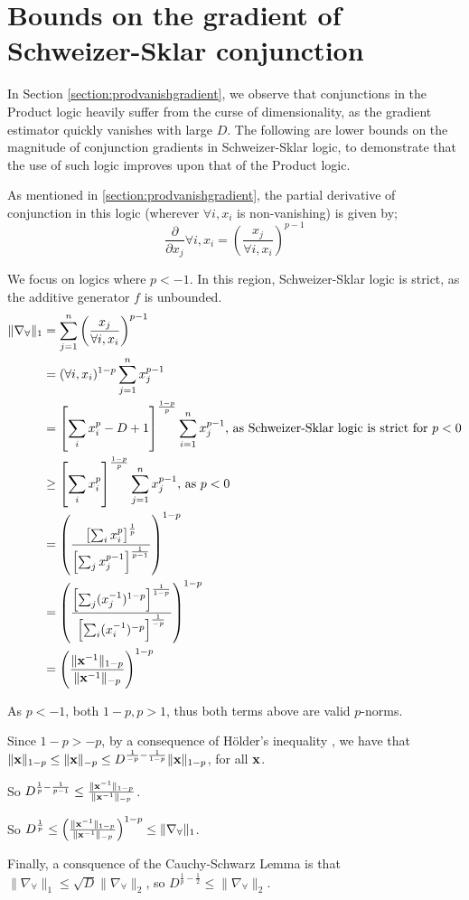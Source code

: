 \chapter{Bounds on the gradient of Schweizer-Sklar conjunction}
\label{section:ssbounds}

In Section \ref{section:prodvanishgradient}, we observe that conjunctions in the Product logic heavily suffer from the curse of dimensionality, as the gradient estimator quickly vanishes with large $D$. The following are lower bounds on the magnitude of conjunction gradients in Schweizer-Sklar logic, to demonstrate that the use of such logic improves upon that of the Product logic.

As mentioned in \ref{section:prodvanishgradient}, the partial derivative of conjunction in this logic (wherever $\forall i, x_i$ is non-vanishing) is given by;
$$\frac{\partial}{\partial x_j} \forall i, x_i = \left(\frac{x_j}{\forall i, x_i}\right)^{p-1}$$

We focus on logics where $p < -1$. In this region, Schweizer-Sklar logic is strict, as the additive generator $f$ is unbounded.
$$
\begin{aligned}
\lVert \nabla_\forall \rVert_1
&= \sum_{j=1}^n \left(\frac{x_j}{\forall i, x_i}\right)^{p-1} \\
&= (\forall i, x_i)^{1-p}\sum_{j=1}^nx_j^{p-1} \\
&= \left[\sum_ix_i^p-D+1\right]^\frac{1-p}{p}\sum_{i=1}^nx_j^{p-1} \text{, as Schweizer-Sklar logic is strict for } p < 0 \\
&\geq \left[\sum_ix_i^p\right]^\frac{1-p}{p}\sum_{j=1}^nx_j^{p-1} \text{, as } p < 0 \\
&= \left(\frac{\left[\sum_ix_i^p\right]^\frac{1}{p}}{\left[\sum_jx_j^{p-1}\right]^\frac{1}{p-1}}\right)^{1-p} \\
&= \left(\frac{\left[\sum_j(x_j^{-1})^{1-p}\right]^\frac{1}{1-p}}{\left[\sum_i(x_i^{-1})^{-p}\right]^\frac{1}{-p}}\right)^{1-p} \\
&= \left(\frac{\lVert \mathbf{x}^{-1} \rVert_{1-p}}{\lVert \mathbf{x}^{-1} \rVert_{-p}}\right)^{1-p} \\
\end{aligned}
$$

As $p < -1$, both $1-p, p > 1$, thus both terms above are valid $p$-norms.

Since $1 - p > -p$, by a consequence of Hölder's inequality \cite[Ch. 7, Corollary 3]{realanal}, we have that $\lVert \mathbf{x} \rVert_{1-p} \leq \lVert \mathbf{x} \rVert_{-p} \leq D^{\frac{1}{-p} - \frac{1}{1-p}} \lVert \mathbf{x} \rVert_{1-p}$, for all $\mathbf{x}$.

So $D^{\frac{1}{p}-\frac{1}{p-1}} \leq \frac{\lVert \mathbf{x}^{-1} \rVert_{1-p}}{\lVert \mathbf{x}^{-1} \rVert_{-p}}$.

So $D^\frac{1}{p} \leq \left(\frac{\lVert \mathbf{x}^{-1} \rVert_{1-p}}{\lVert \mathbf{x}^{-1} \rVert_{-p}}\right)^{1-p} \leq \lVert \nabla_\forall \rVert_1$.

Finally, a consquence of the Cauchy-Schwarz Lemma is that $\lVert \nabla_\forall \rVert_1 \leq \sqrt{D}\lVert \nabla_\forall \rVert_2$, so $D^{\frac{1}{p}-\frac{1}{2}} \leq \lVert \nabla_\forall \rVert_2$.



